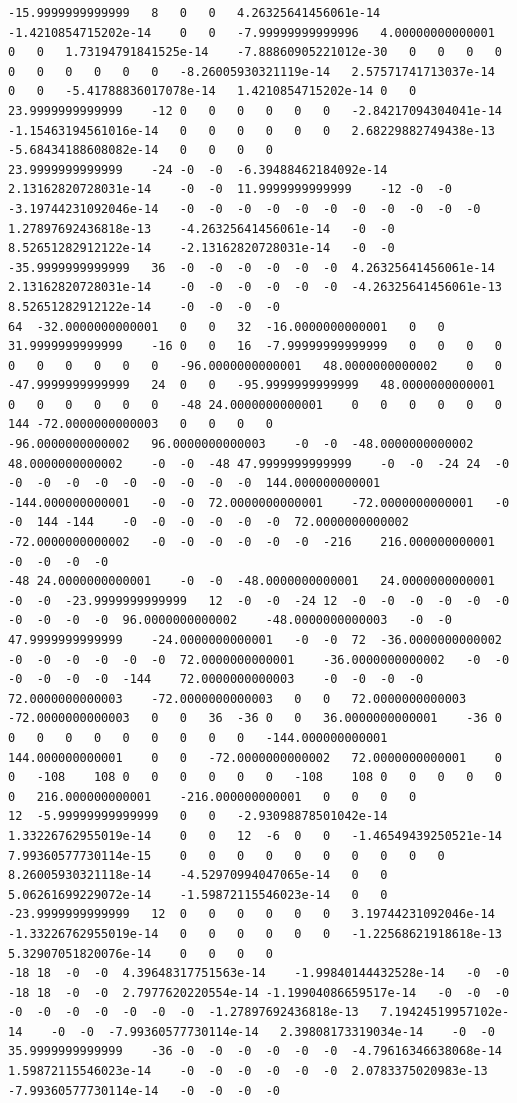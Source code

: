 \documentclass[12pt]{report} %
\begin{document}
\begin{landscape}
\begin{lstlisting}[numbers=none, basicstyle=\ttfamily\tiny, captionpos=b, caption={Matriz de coeficientes $W = G^{-1}$ ($54\times54$) calculada con MATLAB, sin redondear.}, label=cod:W-matlab]
-15.9999999999999	8	0	0	4.26325641456061e-14	-1.4210854715202e-14	0	0	-7.99999999999996	4.00000000000001	0	0	1.73194791841525e-14	-7.88860905221012e-30	0	0	0	0	0	0	0	0	0	0	-8.26005930321119e-14	2.57571741713037e-14	0	0	-5.41788836017078e-14	1.4210854715202e-14	0	0	23.9999999999999	-12	0	0	0	0	0	0	-2.84217094304041e-14	-1.15463194561016e-14	0	0	0	0	0	0	2.68229882749438e-13	-5.68434188608082e-14	0	0	0	0
23.9999999999999	-24	-0	-0	-6.39488462184092e-14	2.13162820728031e-14	-0	-0	11.9999999999999	-12	-0	-0	-3.19744231092046e-14	-0	-0	-0	-0	-0	-0	-0	-0	-0	-0	-0	1.27897692436818e-13	-4.26325641456061e-14	-0	-0	8.52651282912122e-14	-2.13162820728031e-14	-0	-0	-35.9999999999999	36	-0	-0	-0	-0	-0	-0	4.26325641456061e-14	2.13162820728031e-14	-0	-0	-0	-0	-0	-0	-4.26325641456061e-13	8.52651282912122e-14	-0	-0	-0	-0
64	-32.0000000000001	0	0	32	-16.0000000000001	0	0	31.9999999999999	-16	0	0	16	-7.99999999999999	0	0	0	0	0	0	0	0	0	0	-96.0000000000001	48.0000000000002	0	0	-47.9999999999999	24	0	0	-95.9999999999999	48.0000000000001	0	0	0	0	0	0	-48	24.0000000000001	0	0	0	0	0	0	144	-72.0000000000003	0	0	0	0
-96.0000000000002	96.0000000000003	-0	-0	-48.0000000000002	48.0000000000002	-0	-0	-48	47.9999999999999	-0	-0	-24	24	-0	-0	-0	-0	-0	-0	-0	-0	-0	-0	144.000000000001	-144.000000000001	-0	-0	72.0000000000001	-72.0000000000001	-0	-0	144	-144	-0	-0	-0	-0	-0	-0	72.0000000000002	-72.0000000000002	-0	-0	-0	-0	-0	-0	-216	216.000000000001	-0	-0	-0	-0
-48	24.0000000000001	-0	-0	-48.0000000000001	24.0000000000001	-0	-0	-23.9999999999999	12	-0	-0	-24	12	-0	-0	-0	-0	-0	-0	-0	-0	-0	-0	96.0000000000002	-48.0000000000003	-0	-0	47.9999999999999	-24.0000000000001	-0	-0	72	-36.0000000000002	-0	-0	-0	-0	-0	-0	72.0000000000001	-36.0000000000002	-0	-0	-0	-0	-0	-0	-144	72.0000000000003	-0	-0	-0	-0
72.0000000000003	-72.0000000000003	0	0	72.0000000000003	-72.0000000000003	0	0	36	-36	0	0	36.0000000000001	-36	0	0	0	0	0	0	0	0	0	0	-144.000000000001	144.000000000001	0	0	-72.0000000000002	72.0000000000001	0	0	-108	108	0	0	0	0	0	0	-108	108	0	0	0	0	0	0	216.000000000001	-216.000000000001	0	0	0	0
12	-5.99999999999999	0	0	-2.93098878501042e-14	1.33226762955019e-14	0	0	12	-6	0	0	-1.46549439250521e-14	7.99360577730114e-15	0	0	0	0	0	0	0	0	0	0	8.26005930321118e-14	-4.52970994047065e-14	0	0	5.06261699229072e-14	-1.59872115546023e-14	0	0	-23.9999999999999	12	0	0	0	0	0	0	3.19744231092046e-14	-1.33226762955019e-14	0	0	0	0	0	0	-1.22568621918618e-13	5.32907051820076e-14	0	0	0	0
-18	18	-0	-0	4.39648317751563e-14	-1.99840144432528e-14	-0	-0	-18	18	-0	-0	2.7977620220554e-14	-1.19904086659517e-14	-0	-0	-0	-0	-0	-0	-0	-0	-0	-0	-1.27897692436818e-13	7.19424519957102e-14	-0	-0	-7.99360577730114e-14	2.39808173319034e-14	-0	-0	35.9999999999999	-36	-0	-0	-0	-0	-0	-0	-4.79616346638068e-14	1.59872115546023e-14	-0	-0	-0	-0	-0	-0	2.0783375020983e-13	-7.99360577730114e-14	-0	-0	-0	-0

\end{lstlisting}
\end{landscape}
\end{document}

